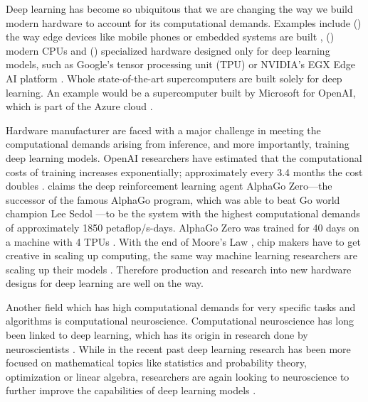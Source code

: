 \documentclass[]{article}
\begin{document}
Deep learning has become so ubiquitous that we are changing the
way we build modern hardware to account for its computational demands.
Examples include () the way edge devices like mobile
phones or embedded systems are built \citep{deng_2019},
() modern CPUs \citep{perez_2017} and ()
specialized hardware designed only for deep learning models, such
as Google's tensor processing unit (TPU) \citep{jouppi_et_al_2017} or
NVIDIA's EGX Edge AI platform \citep{boitano_2020}.
Whole state-of-the-art supercomputers are built solely for deep
learning.
An example would be a supercomputer built by Microsoft for OpenAI,
which is part of the Azure cloud \citep{langston_2020}.

Hardware manufacturer are faced with a major challenge in meeting the
computational demands arising from inference, and more importantly,
training deep learning models.
OpenAI researchers have estimated that the computational costs of
training increases exponentially; approximately every 3.4 months the
cost doubles \citep{amodei_et_al_2019}.
\citet{amodei_et_al_2019} claims the deep reinforcement learning agent
AlphaGo Zero---the successor of the famous AlphaGo program, which
was able to beat Go world champion Lee Sedol
\citep{silver_et_al_2017}---to be the system  with the highest
computational demands of approximately 1850 petaflop/s-days.
AlphaGo Zero was trained for 40 days on a machine with 4 TPUs
\citep{silver_et_al_2017}.
With the end of Moore's Law \citep{loeffler_2018}, chip makers have to
get creative in scaling up computing, the same way machine learning
researchers are scaling up their models \citep{simonite_2016}.
Therefore production and research into new hardware designs for deep
learning are well on the way.

Another field which has high computational demands for very specific
tasks and algorithms is computational neuroscience.
Computational neuroscience has long been linked to deep learning,
which has its origin in research done by neuroscientists
\citep{goodfellow_et_al_2016, mcculloch_et_al_1943}.
While in the recent past deep learning research has been more focused
on mathematical topics like statistics and probability theory,
optimization or linear algebra, researchers are again looking to
neuroscience to further improve the capabilities of deep
learning models \citep{marblestone_et_al_2016}.
\end{document}
